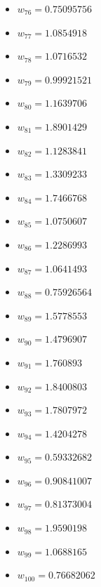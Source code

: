 \documentclass[11pt]{article}
\begin{document}
\begin{itemize}
\item $w_{76} = 0.75095756$
\item $w_{77} = 1.0854918$
\item $w_{78} = 1.0716532$
\item $w_{79} = 0.99921521$
\item $w_{80} = 1.1639706$
\item $w_{81} = 1.8901429$
\item $w_{82} = 1.1283841$
\item $w_{83} = 1.3309233$
\item $w_{84} = 1.7466768$
\item $w_{85} = 1.0750607$
\item $w_{86} = 1.2286993$
\item $w_{87} = 1.0641493$
\item $w_{88} = 0.75926564$
\item $w_{89} = 1.5778553$
\item $w_{90} = 1.4796907$
\item $w_{91} = 1.760893$
\item $w_{92} = 1.8400803$
\item $w_{93} = 1.7807972$
\item $w_{94} = 1.4204278$
\item $w_{95} = 0.59332682$
\item $w_{96} = 0.90841007$
\item $w_{97} = 0.81373004$
\item $w_{98} = 1.9590198$
\item $w_{99} = 1.0688165$
\item $w_{100} = 0.76682062$
\end{itemize}
\end{document}
